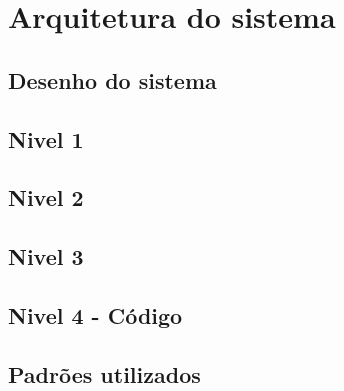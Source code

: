 \section{Arquitetura do sistema}

\subsection{Desenho do sistema}

\subsection{Nivel 1}

\subsection{Nivel 2}

\subsection{Nivel 3}

\subsection{Nivel 4 - Código}

\subsection{Padrões utilizados}
